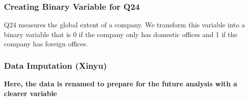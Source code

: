 \documentclass[
]{article}
\newenvironment{Shaded}{\begin{snugshade}}{\end{snugshade}}
\newcommand{\CommentTok}[1]{\textcolor[rgb]{0.56,0.35,0.01}{\textit{#1}}}
\newcommand{\DecValTok}[1]{\textcolor[rgb]{0.00,0.00,0.81}{#1}}
\newcommand{\KeywordTok}[1]{\textcolor[rgb]{0.13,0.29,0.53}{\textbf{#1}}}
\newcommand{\NormalTok}[1]{#1}
\newcommand{\OperatorTok}[1]{\textcolor[rgb]{0.81,0.36,0.00}{\textbf{#1}}}
\newcommand{\OtherTok}[1]{\textcolor[rgb]{0.56,0.35,0.01}{#1}}
\newcommand{\StringTok}[1]{\textcolor[rgb]{0.31,0.60,0.02}{#1}}
\begin{document}
\hypertarget{creating-binary-variable-for-q24}{%
\subsubsection{Creating Binary Variable for
Q24}\label{creating-binary-variable-for-q24}}

Q24 measures the global extent of a company. We transform this variable
into a binary variable that is 0 if the company only has domestic
offices and 1 if the company has foreign offices.

\begin{Shaded}
\end{Shaded}

\hypertarget{data-imputation-xinyu}{%
\subsubsection{Data Imputation (Xinyu)}\label{data-imputation-xinyu}}

\textbf{Here, the data is renamed to prepare for the future analysis
with a clearer variable}
\end{document}
